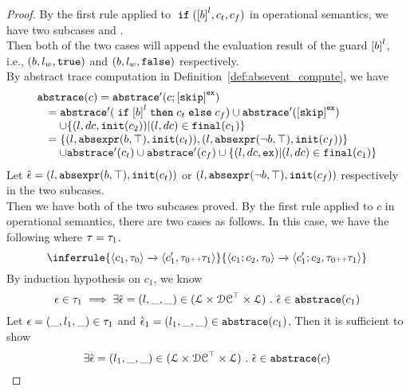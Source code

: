 \begin{proof}
    By the first rule applied to $\eif(\clabel{b}^l, c_t, c_f)$ in operational semantics,
    we have two subcases  and .
    \\
    Then both of the two cases will append the evaluation result of the guard $\clabel{b}^l$, i.e., $(b, l_w, \mathtt{true})$ and $(b, l_w, \mathtt{false})$ respectively.
    \\
    By abstract trace computation in Definition~\ref{def:absevent_compute}, we have
    \[
      \begin{array}{l}
        \absflow(c) = \absflow'(c; \clabel{\eskip}^{\lex}) 
        \\ \quad
        = \absflow'(\eif \clabel{b}^l \ethen c_t \eelse c_f) \cup \absflow'(\clabel{\eskip}^{\lex}) 
        \\ \quad \quad 
        \cup \{ (l, dc, \absinit(c_2)) | (l, dc) \in \absfinal(c_1) \} 
        \\ \quad  
        = \{(l, \absexpr(\bexpr, \top),  \absinit(c_t) ) ,  (l, \absexpr(\neg\bexpr, \top), \absinit(c_f)) \}
        \\ \quad \quad 
        \cup \absflow'(c_t) \cup \absflow'(c_f) 
        \cup \{ (l, dc, \lex) | (l, dc) \in \absfinal(c_1) \} 
     \end{array}
    \]
    Let $\hat{\mathtt{\epsilon}{}} = (l, \mathtt{abs}{\mathtt{expr}}(b, \top),  \mathtt{init}(c_t) ) $ or $ (l, \mathtt{abs}{\mathtt{expr}}(\neg b, \top), \mathtt{init}(c_f)) $
    respectively in the two subcases.
    \\
    Then we have both of the two subcases proved.
    By the first rule applied to $c$ in operational semantics, there are two cases as follows.
    In this case, we have the following where $\mathtt{\tau} = \mathtt{\tau}_1$.
    \[
      \inferrule
      {
      \config{{c_1, \trace_0}}
      \xrightarrow{}
      \config{{c_1',  \trace_0 \tracecat \trace_1}}
      }
      {
      \config{{c_1; c_2, \trace_0}} 
      \xrightarrow{} 
      \config{{c_1'; c_2, \trace_0 \tracecat \trace_1}}
      }
    \]
    By induction hypothesis on $c_1$, we know 
    \[
      \mathtt{\epsilon} \in \mathtt{\tau}_1
      \implies
      \exists \hat{\mathtt{\epsilon}{}} = (l, \_, \_) \in (\mathcal{L} \times \mathcal{DC}^{\top} \times \mathcal{L}) ~.~ 
      \hat{\mathtt{\epsilon}{}} \in \mathtt{abs}{\mathtt{trace}}(c_1)
    \]
    Let $\mathtt{\epsilon} = (\_, l_1, \_) \in \mathtt{\tau}_1$ and $\hat{\mathtt{\epsilon}{}}_1 = (l_1, \_, \_) \in \mathtt{abs}{\mathtt{trace}}(c_1)$,
    Then it is sufficient to show
    \[
      \exists \hat{\mathtt{\epsilon}{}} = (l_1, \_, \_) \in (\mathcal{L} \times \mathcal{DC}^{\top} \times \mathcal{L}) ~.~ 
      \hat{\mathtt{\epsilon}{}} \in \mathtt{abs}{\mathtt{trace}}(c)
\]
\end{proof}
